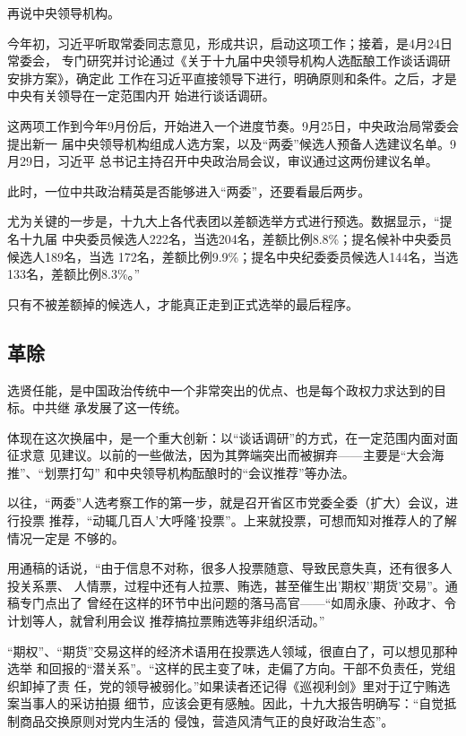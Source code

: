 \documentclass[11pt]{ctexart}
\begin{document}
{{{{再说中央领导机构。

今年初，习近平听取常委同志意见，形成共识，启动这项工作；接着，是4月24日常委会，
专门研究并讨论通过《关于十九届中央领导机构人选酝酿工作谈话调研安排方案》，确定此
工作在习近平直接领导下进行，明确原则和条件。之后，才是中央有关领导在一定范围内开
始进行谈话调研。

这两项工作到今年9月份后，开始进入一个进度节奏。9月25日，中央政治局常委会提出新一
届中央领导机构组成人选方案，以及“两委”候选人预备人选建议名单。9月29日，习近平
总书记主持召开中央政治局会议，审议通过这两份建议名单。

此时，一位中共政治精英是否能够进入“两委”，还要看最后两步。

尤为关键的一步是，十九大上各代表团以差额选举方式进行预选。数据显示，“提名十九届
中央委员候选人222名，当选204名，差额比例8.8\%；提名候补中央委员候选人189名，当选
172名，差额比例9.9\%；提名中央纪委委员候选人144名，当选133名，差额比例8.3\%。”

只有不被差额掉的候选人，才能真正走到正式选举的最后程序。



\subsection{革除}
\label{sec:orge6295b1}

选贤任能，是中国政治传统中一个非常突出的优点、也是每个政权力求达到的目标。中共继
承发展了这一传统。

体现在这次换届中，是一个重大创新：以“谈话调研”的方式，在一定范围内面对面征求意
见建议。以前的一些做法，因为其弊端突出而被摒弃——主要是“大会海推”、“划票打勾”
和中央领导机构酝酿时的“会议推荐”等办法。

以往，“两委”人选考察工作的第一步，就是召开省区市党委全委（扩大）会议，进行投票
推荐，“动辄几百人’大呼隆’投票”。上来就投票，可想而知对推荐人的了解情况一定是
不够的。

用通稿的话说，“由于信息不对称，很多人投票随意、导致民意失真，还有很多人投关系票、
人情票，过程中还有人拉票、贿选，甚至催生出’期权’’期货’交易”。通稿专门点出了
曾经在这样的环节中出问题的落马高官——“如周永康、孙政才、令计划等人，就曾利用会议
推荐搞拉票贿选等非组织活动。”

“期权”、“期货”交易这样的经济术语用在投票选人领域，很直白了，可以想见那种选举
和回报的“潜关系”。“这样的民主变了味，走偏了方向。干部不负责任，党组织卸掉了责
任，党的领导被弱化。”如果读者还记得《巡视利剑》里对于辽宁贿选案当事人的采访拍摄
细节，应该会更有感触。因此，十九大报告明确写：“自觉抵制商品交换原则对党内生活的
侵蚀，营造风清气正的良好政治生态”。

}}}}
\end{document}
